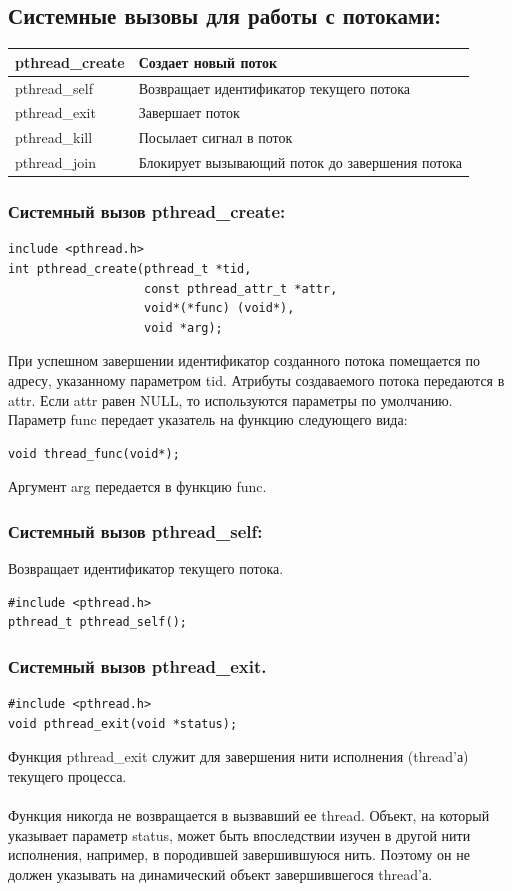 \documentclass[a4paper]{article}
\begin{document}
\subsection{\Large Системные вызовы для работы с потоками:}
\begin{center}
  \begin{tabular}{|p{4cm}|p{11cm}|}
  \hline
  pthread\_create & Создает новый поток \\
  \hline
  pthread\_self & Возвращает идентификатор текущего потока \\
  \hline
  pthread\_exit & Завершает поток \\
  \hline
  pthread\_kill & Посылает сигнал в поток \\
  \hline
  pthread\_join & Блокирует вызывающий поток до завершения потока \\
  \hline
  \end{tabular}
\end{center}

\subsubsection{\Large Системный вызов pthread\_create:}
\begin{verbatim}
include <pthread.h>
int pthread_create(pthread_t *tid, 
                   const pthread_attr_t *attr, 
                   void*(*func) (void*), 
                   void *arg);
\end{verbatim}
При успешном завершении идентификатор созданного потока помещается по адресу, указанному параметром tid. Атрибуты создаваемого потока передаются в attr. Если attr равен NULL, то используются параметры по умолчанию. Параметр func передает указатель на функцию следующего вида:
\begin{verbatim}
void thread_func(void*);
\end{verbatim}
Аргумент arg передается в функцию func.

\subsubsection{\Large Системный вызов pthread\_self:}
Возвращает идентификатор текущего потока.
\begin{verbatim}
#include <pthread.h>
pthread_t pthread_self();
\end{verbatim}

\subsubsection{\Large Системный вызов pthread\_exit.}
\begin{verbatim}
#include <pthread.h>
void pthread_exit(void *status);
\end{verbatim}
Функция pthread\_exit служит для завершения нити исполнения (thread'а) текущего процесса.\\\\
Функция никогда не возвращается в вызвавший ее thread. Объект, на который указывает параметр status, может быть впоследствии изучен в другой нити исполнения, например, в породившей завершившуюся нить. Поэтому он не должен указывать на динамический объект завершившегося thread'а.
\end{document}
